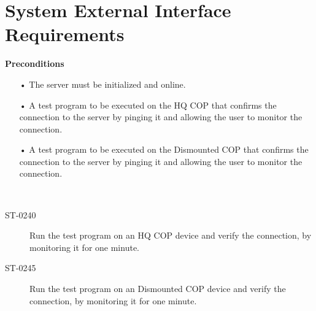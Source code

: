 \section{System External Interface Requirements}
\textbf{Preconditions}
\begin{itemize}
  \item[•] The server must be initialized and online.
  \item[•] A test program to be executed on the HQ COP that confirms the connection to the server by pinging it and allowing the user to monitor the connection.
  \item[•] A test program to be executed on the Dismounted COP that confirms the connection to the server by pinging it and allowing the user to monitor the connection.
\end{itemize}
~\


\begin{description}
  \item[ST-0240] Run the test program on an HQ COP device and verify the connection, by monitoring it for one minute.
  \item[ST-0245] Run the test program on an Dismounted COP device and verify the connection, by monitoring it for one minute.
\end{description}